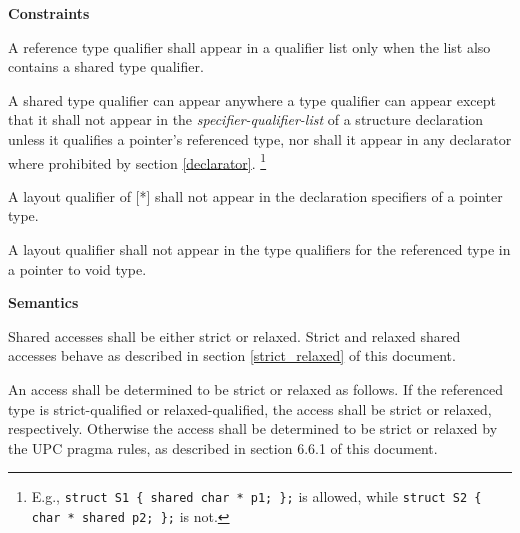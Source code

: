 
\hspace{3em}{\bf relaxed}

\hspace{3em}{\bf strict}



\hspace{3em}{\bf [ {\em *}  ]}

{\bf Constraints} 

\np A reference type qualifier shall appear in a qualifier
    list only when the list also contains a shared type qualifier.

\np A shared type qualifier can appear anywhere a type qualifier can appear
    except that it shall not appear in the {\em specifier-qualifier-list} of a structure
    declaration unless it qualifies a pointer's referenced type, nor shall it appear 
    in any declarator where prohibited by section \ref{declarator}.%
    \footnote{E.g., {\tt struct S1 \{ shared char * p1; \};} is allowed,
    while {\tt struct S2 \{ char * shared p2; \};} is not.}

\np A layout qualifier of [*] shall not appear in the
    declaration specifiers of a pointer type.

\np {}

\np A layout qualifier shall not appear in the type
    qualifiers for the referenced type in a pointer to void type.

{\bf Semantics} 

\np Shared accesses shall be either strict or relaxed.
    Strict and relaxed shared accesses behave as described in section
    \ref{strict_relaxed} of this document.

\np An access shall be determined to be strict or relaxed
    as follows.  If the referenced type is strict-qualified or
    relaxed-qualified, the access shall be strict or relaxed,
    respectively.  Otherwise the access shall be determined to be
    strict or relaxed by the UPC pragma rules, as described in section
    6.6.1 of this document.

